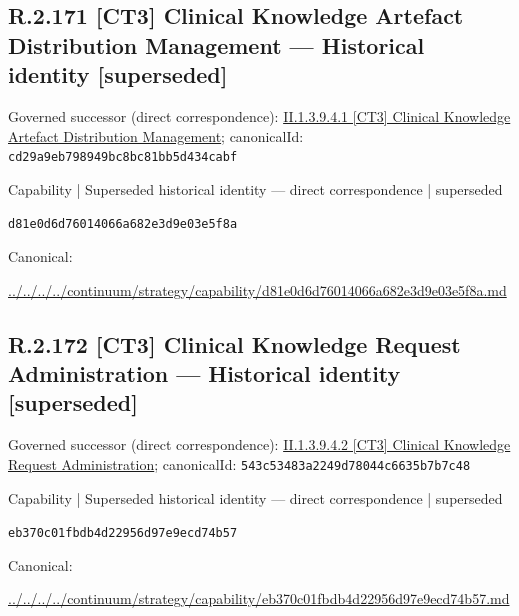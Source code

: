 \documentclass[10pt,a4paper]{article}
\begin{document}
\subsection*{R.2.171 [CT3] Clinical Knowledge Artefact Distribution Management — Historical identity [superseded]}
Governed successor (direct correspondence): \hyperref[element-cd29a9eb798949bc8bc81bb5d434cabf]{II.1.3.9.4.1 [CT3] Clinical Knowledge Artefact Distribution Management}; canonicalId: \texttt{cd29a9eb798949bc8bc81bb5d434cabf}\par
\label{element-d81e0d6d76014066a682e3d9e03e5f8a}
{\small Capability | Superseded historical identity — direct correspondence | superseded}\par
\texttt{d81e0d6d76014066a682e3d9e03e5f8a}\par
Canonical: \par
{\footnotesize\url{../../../../continuum/strategy/capability/d81e0d6d76014066a682e3d9e03e5f8a.md}}\par
\subsection*{R.2.172 [CT3] Clinical Knowledge Request Administration — Historical identity [superseded]}
Governed successor (direct correspondence): \hyperref[element-543c53483a2249d78044c6635b7b7c48]{II.1.3.9.4.2 [CT3] Clinical Knowledge Request Administration}; canonicalId: \texttt{543c53483a2249d78044c6635b7b7c48}\par
\label{element-eb370c01fbdb4d22956d97e9ecd74b57}
{\small Capability | Superseded historical identity — direct correspondence | superseded}\par
\texttt{eb370c01fbdb4d22956d97e9ecd74b57}\par
Canonical: \par
{\footnotesize\url{../../../../continuum/strategy/capability/eb370c01fbdb4d22956d97e9ecd74b57.md}}\par
\end{document}
